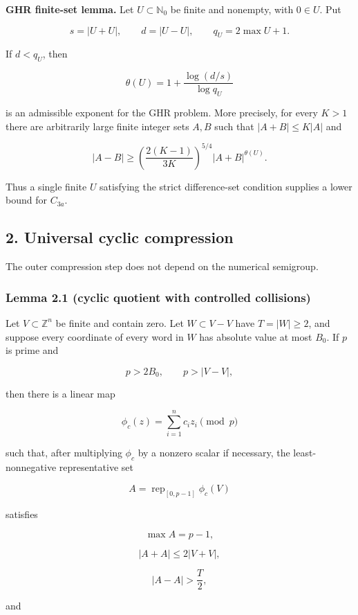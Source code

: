 \documentclass[
  10pt,
]{article}
\begin{document}
\textbf{GHR finite-set lemma.} Let \(U\subset\mathbb N_0\) be finite and
nonempty, with \(0\in U\). Put

\[
s=|U+U|,\qquad d=|U-U|,\qquad q_U=2\max U+1.
\]

If \(d<q_U\), then

\[
\theta(U)=1+\frac{\log(d/s)}{\log q_U}
\]

is an admissible exponent for the GHR problem. More precisely, for every
\(K>1\) there are arbitrarily large finite integer sets \(A,B\) such
that \(|A+B|\le K|A|\) and

\[
|A-B|\ge
\left(\frac{2(K-1)}{3K}\right)^{5/4}|A+B|^{\theta(U)}.
\]

Thus a single finite \(U\) satisfying the strict difference-set
condition supplies a lower bound for \(C_{3a}\).

\subsection{2. Universal cyclic
compression}\label{universal-cyclic-compression}

The outer compression step does not depend on the numerical semigroup.

\subsubsection{Lemma 2.1 (cyclic quotient with controlled
collisions)}\label{lemma-2.1-cyclic-quotient-with-controlled-collisions}

Let \(V\subset\mathbb Z^n\) be finite and contain zero. Let
\(W\subset V-V\) have \(T=|W|\ge2\), and suppose every coordinate of
every word in \(W\) has absolute value at most \(B_0\). If \(p\) is
prime and

\[
p>2B_0,\qquad p>|V-V|,
\]

then there is a linear map

\[
\phi_c(z)=\sum_{i=1}^n c_i z_i\pmod p
\]

such that, after multiplying \(\phi_c\) by a nonzero scalar if
necessary, the least-nonnegative representative set

\[
A=\operatorname{rep}_{[0,p-1]}\phi_c(V)
\]

satisfies

\[
\max A=p-1,
\tag{2.1}
\]

\[
|A+A|\le2|V+V|,
\tag{2.2}
\]

\[
|A-A|>\frac{T}{2},
\tag{2.3}
\]

and
\end{document}
